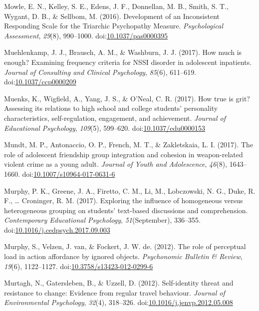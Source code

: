 \documentclass[english,man]{apa6}
\theoremstyle{definition}
\theoremstyle{definition}
\theoremstyle{definition}
\theoremstyle{remark}
\begin{document}
\hypertarget{ref-Mowle2016}{}
Mowle, E. N., Kelley, S. E., Edens, J. F., Donnellan, M. B., Smith, S.
T., Wygant, D. B., \& Sellbom, M. (2016). Development of an Inconsistent
Responding Scale for the Triarchic Psychopathy Measure.
\emph{Psychological Assessment}, \emph{29}(8), 990--1000.
doi:\href{https://doi.org/10.1037/pas0000395}{10.1037/pas0000395}

\hypertarget{ref-Muehlenkamp2017}{}
Muehlenkamp, J. J., Brausch, A. M., \& Washburn, J. J. (2017). How much
is enough? Examining frequency criteria for NSSI disorder in adolescent
inpatients. \emph{Journal of Consulting and Clinical Psychology},
\emph{85}(6), 611--619.
doi:\href{https://doi.org/10.1037/ccp0000209}{10.1037/ccp0000209}

\hypertarget{ref-Muenks2017}{}
Muenks, K., Wigfield, A., Yang, J. S., \& O'Neal, C. R. (2017). How true
is grit? Assessing its relations to high school and college students'
personality characteristics, self-regulation, engagement, and
achievement. \emph{Journal of Educational Psychology}, \emph{109}(5),
599--620.
doi:\href{https://doi.org/10.1037/edu0000153}{10.1037/edu0000153}

\hypertarget{ref-Mundt2017}{}
Mundt, M. P., Antonaccio, O. P., French, M. T., \& Zakletskaia, L. I.
(2017). The role of adolescent friendship group integration and cohesion
in weapon-related violent crime as a young adult. \emph{Journal of Youth
and Adolescence}, \emph{46}(8), 1643--1660.
doi:\href{https://doi.org/10.1007/s10964-017-0631-6}{10.1007/s10964-017-0631-6}

\hypertarget{ref-Murphy2017}{}
Murphy, P. K., Greene, J. A., Firetto, C. M., Li, M., Lobczowski, N. G.,
Duke, R. F., \ldots{} Croninger, R. M. (2017). Exploring the influence
of homogeneous versus heterogeneous grouping on students' text-based
discussions and comprehension. \emph{Contemporary Educational
Psychology}, \emph{51}(September), 336--355.
doi:\href{https://doi.org/10.1016/j.cedpsych.2017.09.003}{10.1016/j.cedpsych.2017.09.003}

\hypertarget{ref-Murphy2012}{}
Murphy, S., Velzen, J. van, \& Fockert, J. W. de. (2012). The role of
perceptual load in action affordance by ignored objects.
\emph{Psychonomic Bulletin \& Review}, \emph{19}(6), 1122--1127.
doi:\href{https://doi.org/10.3758/s13423-012-0299-6}{10.3758/s13423-012-0299-6}

\hypertarget{ref-Murtagh2012}{}
Murtagh, N., Gatersleben, B., \& Uzzell, D. (2012). Self-identity threat
and resistance to change: Evidence from regular travel behaviour.
\emph{Journal of Environmental Psychology}, \emph{32}(4), 318--326.
doi:\href{https://doi.org/10.1016/j.jenvp.2012.05.008}{10.1016/j.jenvp.2012.05.008}
\end{document}

